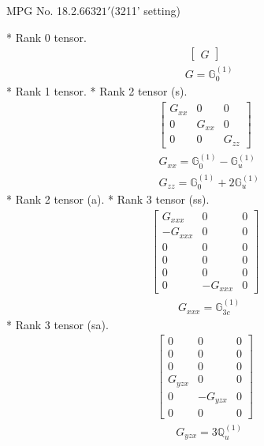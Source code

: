 \documentclass[fleqn,8pt,landscape]{jsarticle}
\begin{document}
\setcounter{MaxMatrixCols}{32}

\renewcommand{\tablename}{Table~}
\renewcommand{\figurename}{Figure~}
\begin{center}
\LARGE
MPG No. 18.2.66\quad$321'$\quad(3211' setting)
\end{center}
* Rank 0 tensor.
\begin{align*}
\begin{bmatrix} G \end{bmatrix}
\end{align*}
\begin{align*}
& G = \mathbb{G}_{0}^{(1)}
\end{align*}
* Rank 1 tensor.
* Rank 2 tensor (s).
\begin{align*}
\begin{bmatrix} G_{xx} & 0 & 0 \\ 0 & G_{xx} & 0 \\ 0 & 0 & G_{zz} \end{bmatrix}
\end{align*}
\begin{align*}
& G_{xx} = \mathbb{G}_{0}^{(1)} - \mathbb{G}_{u}^{(1)} \\
& G_{zz} = \mathbb{G}_{0}^{(1)} + 2 \mathbb{G}_{u}^{(1)}
\end{align*}
* Rank 2 tensor (a).
* Rank 3 tensor (ss).
\begin{align*}
\begin{bmatrix} G_{xxx} & 0 & 0 \\ - G_{xxx} & 0 & 0 \\ 0 & 0 & 0 \\ 0 & 0 & 0 \\ 0 & 0 & 0 \\ 0 & - G_{xxx} & 0 \end{bmatrix}
\end{align*}
\begin{align*}
& G_{xxx} = \mathbb{G}_{3c}^{(1)}
\end{align*}
* Rank 3 tensor (sa).
\begin{align*}
\begin{bmatrix} 0 & 0 & 0 \\ 0 & 0 & 0 \\ 0 & 0 & 0 \\ G_{yzx} & 0 & 0 \\ 0 & - G_{yzx} & 0 \\ 0 & 0 & 0 \end{bmatrix}
\end{align*}
\begin{align*}
& G_{yzx} = 3 \mathbb{Q}_{u}^{(1)}
\end{align*}
\end{document}
